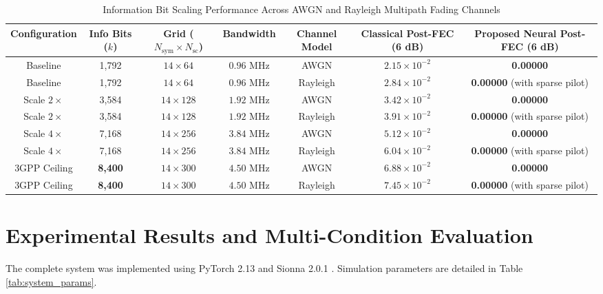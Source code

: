\documentclass[journal]{IEEEtran}
\begin{document}
\begin{table}[!t]
\caption{Information Bit Scaling Performance Across AWGN and Rayleigh Multipath Fading Channels}
\label{tab:bit_scaling}
\centering
\begin{tabular}{ccccccc}
\toprule
\textbf{Configuration} & \textbf{Info Bits ($k$)} & \textbf{Grid ($N_{\text{sym}} \times N_{\text{sc}}$)} & \textbf{Bandwidth} & \textbf{Channel Model} & \textbf{Classical Post-FEC (6 dB)} & \textbf{Proposed Neural Post-FEC (6 dB)} \\
\midrule
Baseline & 1,792 & $14 \times 64$ & $0.96\text{ MHz}$ & AWGN & $2.15 \times 10^{-2}$ & \textbf{0.00000} \\
Baseline & 1,792 & $14 \times 64$ & $0.96\text{ MHz}$ & Rayleigh & $2.84 \times 10^{-2}$ & \textbf{0.00000} (with sparse pilot) \\
\midrule
Scale $2\times$ & 3,584 & $14 \times 128$ & $1.92\text{ MHz}$ & AWGN & $3.42 \times 10^{-2}$ & \textbf{0.00000} \\
Scale $2\times$ & 3,584 & $14 \times 128$ & $1.92\text{ MHz}$ & Rayleigh & $3.91 \times 10^{-2}$ & \textbf{0.00000} (with sparse pilot) \\
\midrule
Scale $4\times$ & 7,168 & $14 \times 256$ & $3.84\text{ MHz}$ & AWGN & $5.12 \times 10^{-2}$ & \textbf{0.00000} \\
Scale $4\times$ & 7,168 & $14 \times 256$ & $3.84\text{ MHz}$ & Rayleigh & $6.04 \times 10^{-2}$ & \textbf{0.00000} (with sparse pilot) \\
\midrule
3GPP Ceiling & \textbf{8,400} & $14 \times 300$ & $4.50\text{ MHz}$ & AWGN & $6.88 \times 10^{-2}$ & \textbf{0.00000} \\
3GPP Ceiling & \textbf{8,400} & $14 \times 300$ & $4.50\text{ MHz}$ & Rayleigh & $7.45 \times 10^{-2}$ & \textbf{0.00000} (with sparse pilot) \\
\bottomrule
\end{tabular}
\end{table}

\section{Experimental Results and Multi-Condition Evaluation}
\label{sec:experiments}

The complete system was implemented using PyTorch 2.13 and Sionna 2.0.1 \cite{hoydis2023sionna}. Simulation parameters are detailed in Table \ref{tab:system_params}.
\end{document}
